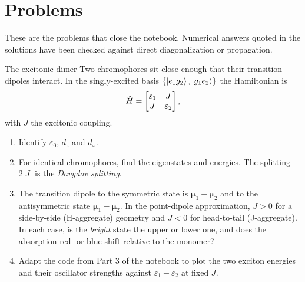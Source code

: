 \section{Problems}
\label{sec:problems}

These are the problems that close the notebook.\ifsolutions{} Numerical answers quoted
in the solutions have been checked against direct diagonalization or propagation.\fi

\begin{problem}{The excitonic dimer}
\label{prob:exciton}
Two chromophores sit close enough that their transition dipoles interact. In the
singly-excited basis $\{\ket{e_1 g_2},\ket{g_1 e_2}\}$ the Hamiltonian is
\[
\hat{H} = \begin{bmatrix}\varepsilon_1 & J \\ J & \varepsilon_2\end{bmatrix},
\]
with $J$ the excitonic coupling.
\begin{enumerate}[label=(\alph*),leftmargin=*,itemsep=1pt]
\item Identify $\varepsilon_0$, $d_z$ and $d_x$.
\item For identical chromophores, find the eigenstates and energies. The splitting
$2|J|$ is the \emph{Davydov splitting}.
\item The transition dipole to the symmetric state is
$\bm{\mu}_1+\bm{\mu}_2$ and to the antisymmetric state $\bm{\mu}_1-\bm{\mu}_2$. In the
point-dipole approximation, $J>0$ for a side-by-side (H-aggregate) geometry and $J<0$
for head-to-tail (J-aggregate). In each case, is the \emph{bright} state the upper or
lower one, and does the absorption red- or blue-shift relative to the monomer?
\item Adapt the code from Part 3 of the notebook to plot the two exciton energies and
their oscillator strengths against $\varepsilon_1-\varepsilon_2$ at fixed $J$.
\end{enumerate}
\end{problem}


